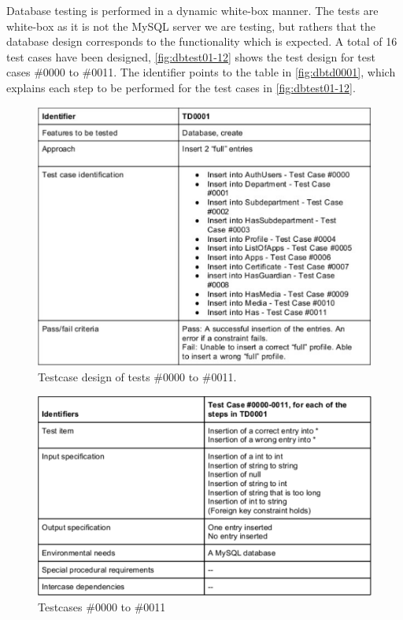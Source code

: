 Database testing is performed in a dynamic white-box manner. The tests are white-box as it is not the MySQL server we are testing, but rathers that the database design
corresponds to the functionality which is expected. A total of 16 test cases have been designed, \autoref{fig:dbtest01-12} shows the test design for test cases \#0000 to \#0011.
The identifier  points to the table in \autoref{fig:dbtd0001}, which explains each step to be performed for the test cases in \autoref{fig:dbtest01-12}.


\begin{figure}[H]
 \includegraphics[scale=1.00]{images/dbtesttd0001}
 \caption{Testcase design of tests \#0000 to \#0011.}
  \label{fig:dbtest01-12}
\end{figure}

\begin{figure}[H]
 \includegraphics[scale=1.00]{images/dbtestcase01-12}
  \caption{Testcases \#0000 to \#0011}
  \label{fig:dbtd0001}
\end{figure}

